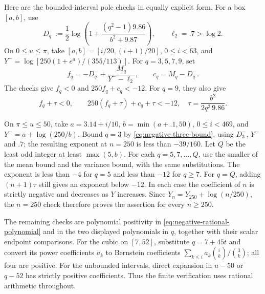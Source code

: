 Here are the bounded-interval pole checks in equally explicit form.
For a box $[a,b]$, use
\[
 D_q^-:=\frac12\log\left(1+
       \frac{(q^2-1)9.86}{b^2+9.87}\right),\qquad
 \ell_2=.7>\log2.
\]
On $0\le u\le\pi$, take $[a,b]=[i/20,(i+1)/20]$,
$0\le i<63$, and
$Y^- =\log[250(1+e^a)/(355/113)]$.
For $q=3,5,7,9$, set
\[
 f_q=-D_q^-+\frac{M_q}{Y^--\ell_2},\qquad
 c_q=M_q-D_q^-.
\]
The checks give $f_q<0$ and $250f_q+c_q<-12$.
For $q=9$, they also give
\[
 f_q+\tau<0,\qquad 250(f_q+\tau)+c_q+\tau<-12,
 \quad \tau=\frac{b^2}{2q^2\,9.86}.
\]

On $\pi\le u\le50$, take
$a=3.14+i/10$, $b=\min(a+.1,50)$, $0\le i<469$, and
$Y^-=a+\log(250/b)$. Bound $q=3$ by
\eqref{eq:negative-three-bound}, using $D_3^-$, $Y^-$ and $.7$;
the resulting exponent at $n=250$ is less than $-39/160$.
Let $Q$ be the least odd integer at least $\max(5,b)$.
For each $q=5,7,\ldots,Q$, use the smaller of the mean bound and the
variance bound, with the same substitutions. The exponent is less
than $-4$ for $q=5$ and less than $-12$ for $q\ge7$.
For $q=Q$, adding $(n+1)\tau$ still gives an exponent below $-12$.
In each case the coefficient of $n$ is strictly negative and decreases
as $Y$ increases. Since $Y_n=Y_{250}+\log(n/250)$, the $n=250$ check
therefore proves the assertion for every $n\ge250$.

The remaining checks are polynomial positivity in
\eqref{eq:negative-rational-polynomial} and in the two displayed
polynomials in $q$, together with their scalar endpoint comparisons.
For the cubic on $[7,52]$, substitute $q=7+45t$ and convert its power
coefficients $a_k$ to Bernstein coefficients
$\sum_{k\le i}a_k\binom ik/\binom3k$; all four are positive.
For the unbounded intervals, direct expansion in $u-50$ or $q-52$
has strictly positive coefficients. Thus the finite verification uses
rational arithmetic throughout.
